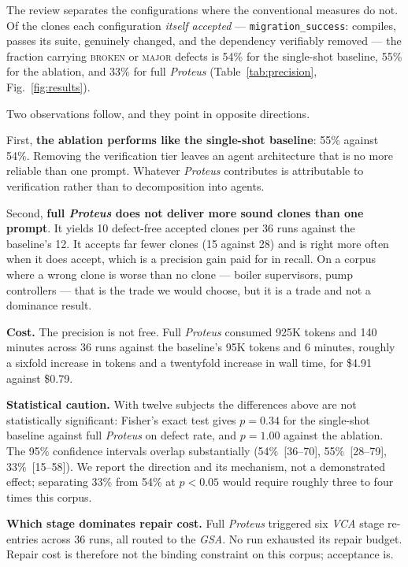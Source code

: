 The review separates the configurations where the conventional measures do
not. Of the clones each configuration \emph{itself accepted} ---
\texttt{migration\_success}: compiles, passes its suite, genuinely changed, and
the dependency verifiably removed --- the fraction carrying \textsc{broken} or
\textsc{major} defects is 54\% for the single-shot baseline, 55\% for the
ablation, and 33\% for full \emph{Proteus} (Table~\ref{tab:precision},
Fig.~\ref{fig:results}).

Two observations follow, and they point in opposite directions.

First, \textbf{the ablation performs like the single-shot baseline}: 55\%
against 54\%. Removing the verification tier leaves an agent architecture that
is no more reliable than one prompt. Whatever \emph{Proteus} contributes is
attributable to verification rather than to decomposition into agents.

Second, \textbf{full \emph{Proteus} does not deliver more sound clones than one
prompt}. It yields 10 defect-free accepted clones per 36 runs against the
baseline's 12. It accepts far fewer clones (15 against 28) and is right more
often when it does accept, which is a precision gain paid for in recall. On a
corpus where a wrong clone is worse than no clone --- boiler supervisors, pump
controllers --- that is the trade we would choose, but it is a trade and not a
dominance result.

\textbf{Cost.} The precision is not free. Full \emph{Proteus} consumed 925K
tokens and 140 minutes across 36 runs against the baseline's 95K tokens and
6 minutes, roughly a sixfold increase in tokens and a twentyfold increase in
wall time, for \$4.91 against \$0.79.

\textbf{Statistical caution.} With twelve subjects the differences above are
not statistically significant: Fisher's exact test gives $p=0.34$ for the
single-shot baseline against full \emph{Proteus} on defect rate, and $p=1.00$
against the ablation. The 95\% confidence intervals overlap substantially
(54\%~[36--70], 55\%~[28--79], 33\%~[15--58]). We report the direction and its
mechanism, not a demonstrated effect; separating 33\% from 54\% at $p<0.05$
would require roughly three to four times this corpus.


\textbf{Which stage dominates repair cost.} Full \emph{Proteus} triggered six
\emph{VCA} stage re-entries across 36 runs, all routed to the \emph{GSA}. No
run exhausted its repair budget. Repair cost is therefore not the binding
constraint on this corpus; acceptance is.

